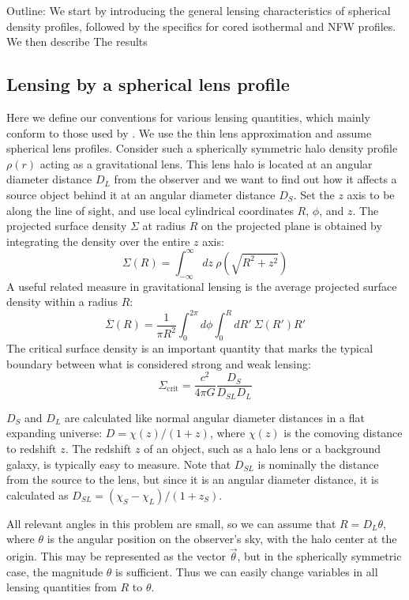\documentclass[10pt]{article}
\begin{document}
Outline:
We start by introducing the general lensing characteristics of spherical density profiles, followed by the specifics for cored isothermal and NFW profiles. We then describe
The results


\subsection{Lensing by a spherical lens profile}
Here we define our conventions for various lensing quantities, which mainly conform to those used by \citet{Dodelson2017}. We use the thin lens approximation and assume spherical lens profiles. Consider such a spherically symmetric halo density profile $\rho(r)$ acting as a gravitational lens. This lens halo is located at an angular diameter distance $D_L$ from the observer and we want to find out how it affects a source object behind it at an angular diameter distance $D_S$. Set the $z$ axis to be along the line of sight, and use local cylindrical coordinates $R$, $\phi$, and $z$. The projected surface density $\Sigma$ at radius $R$ on the projected plane is obtained by integrating the density over the entire $z$ axis:
\begin{equation} \label{sigma}
\Sigma(R) = \int_{-\infty}^{\infty}{dz\ \rho(\sqrt{R^2 + z^2})}
\end{equation}
A useful related measure in gravitational lensing is the average projected surface density within a radius $R$:
\begin{equation} \label{sigmabar}
\overline{\Sigma}(R) = \frac{1}{\pi R^2} \int_0^{2\pi}{d\phi \int_0^{R}{dR'~\Sigma(R')R'}}
\end{equation}
The critical surface density is an important quantity that marks the typical boundary between what is considered strong and weak lensing:
\begin{equation} \label{sigmacrit}
\Sigma_\mathrm{crit} = \frac{c^2}{4\pi G} \frac{D_S}{D_{SL} D_L}
\end{equation}

$D_S$ and $D_L$ are calculated like normal angular diameter distances in a flat expanding universe: $D = \chi(z)/(1 + z)$, where $\chi(z)$ is the comoving distance to redshift $z$. The redshift $z$ of an object, such as a halo lens or a background galaxy, is typically easy to measure. Note that $D_{SL}$ is nominally the distance from the source to the lens, but since it is an angular diameter distance, it is calculated as $D_{SL} = (\chi_S - \chi_L)/(1 + z_S)$.

All relevant angles in this problem are small, so we can assume that $R = D_L \theta$, where $\theta$ is the angular position on the observer's sky, with the halo center at the origin. This may be represented as the vector $\vec{\theta}$, but in the spherically symmetric case, the magnitude $\theta$ is sufficient. Thus we can easily change variables in all lensing quantities from $R$ to $\theta$.
\end{document}
